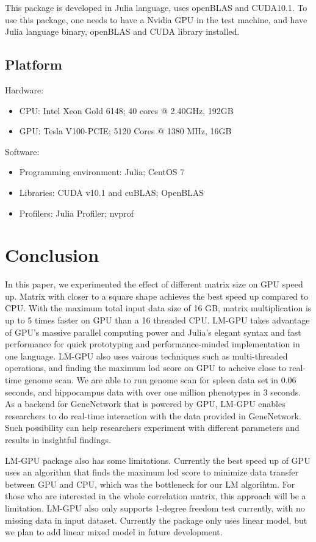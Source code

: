 \documentclass[9pt,twocolumn,twoside,lineno]{gsag3jnl}
\begin{document}
This package is developed in Julia language, uses openBLAS and CUDA10.1. 
To use this package, one needs to have a Nvidia GPU in the test machine,
and have Julia language binary, openBLAS and CUDA library installed. 

\subsection{Platform}
Hardware:
 \begin{itemize}
	\item CPU: Intel Xeon Gold 6148; 40 cores @ 2.40GHz, 192GB 
	\item GPU: Tesla V100-PCIE; 5120 Cores @ 1380 MHz, 16GB
\end{itemize}
Software: 
\begin{itemize}
	\item Programming environment: Julia; CentOS 7
	\item Libraries: CUDA v10.1 and cuBLAS; OpenBLAS
	\item Profilers: Julia Profiler; nvprof
\end{itemize}

\section{Conclusion}

In this paper, we experimented the effect of different matrix size on GPU speed up. 
Matrix with closer to a square shape achieves the best speed up compared to CPU. 
With the maximum total input data size of 16 GB, matrix multiplication is up to 5 times faster on GPU than a 16 threaded CPU. 
LM-GPU takes advantage of GPU's massive parallel computing power and Julia's elegant syntax and fast performance for quick prototyping and performance-minded implementation in one language. 
LM-GPU also uses vairous techniques such as multi-threaded operations, and finding the maximum lod score on GPU to acheive close to real-time genome scan.
We are able to run genome scan for spleen data set in 0.06 seconds, and hippocampus data with over one million phenotypes in 3 seconds. 
As a backend for GeneNetwork that is powered by GPU, LM-GPU enables researchers to do real-time interaction with the data provided in GeneNetwork. 
Such possibility can help researchers experiment with different parameters and results in insightful findings. 

LM-GPU package also has some limitations. 
Currently the best speed up of GPU uses an algorithm that finds the maximum lod score to minimize data transfer between GPU and CPU, which was the bottleneck for our LM algorihtm. 
For those who are interested in the whole correlation matrix, this approach will be a limitation. 
LM-GPU also only supports 1-degree freedom test currently, with no missing data in input dataset. 
Currently the package only uses linear model, but we plan to add linear mixed model in future development. 




\end{document}
